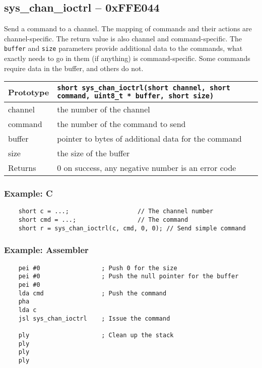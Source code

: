 \subsection*{sys\_chan\_ioctrl -- 0xFFE044}
Send a command to a channel.
The mapping of commands and their actions are channel-specific.
The return value is also channel and command-specific.
The \verb+buffer+ and \verb+size+ parameters provide additional data to the commands,
what exactly needs to go in them (if anything) is command-specific.
Some commands require data in the buffer, and others do not.

\bigskip

\begin{tabular}{|l||l|} \hline
Prototype & \lstinline!short sys_chan_ioctrl(short channel, short command, uint8_t * buffer, short size)! \\ \hline
channel & the number of the channel \\ \hline
command & the number of the command to send \\ \hline
buffer & pointer to bytes of additional data for the command \\ \hline
size & the size of the buffer \\ \hline
Returns & 0 on success, any negative number is an error code \\ \hline
\end{tabular}

\subsubsection*{Example: C}
\begin{lstlisting}
    short c = ...;                   // The channel number
    short cmd = ...;                 // The command
    short r = sys_chan_ioctrl(c, cmd, 0, 0); // Send simple command
\end{lstlisting}

\subsubsection*{Example: Assembler}
\begin{verbatim}
    pei #0                 ; Push 0 for the size
    pei #0                 ; Push the null pointer for the buffer
    pei #0
    lda cmd                ; Push the command
    pha
    lda c
    jsl sys_chan_ioctrl    ; Issue the command

    ply                    ; Clean up the stack
    ply
    ply
    ply
\end{verbatim}


